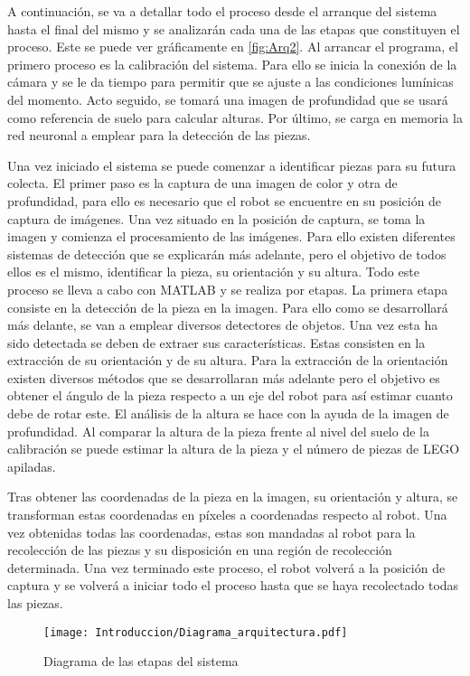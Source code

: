 A continuación, se va a detallar todo el proceso desde el arranque del sistema hasta el final del mismo y se analizarán cada una de las etapas que constituyen el proceso. Este se puede ver gráficamente en \autoref{fig:Arq2}. Al arrancar el programa, el primero proceso es la calibración del sistema. Para ello se inicia la conexión de la cámara y se le da tiempo para permitir que se ajuste a las condiciones lumínicas del momento. Acto seguido, se tomará una imagen de profundidad que se usará como referencia de suelo para calcular alturas. Por último, se carga en memoria la red neuronal a emplear para la detección de las piezas.

Una vez iniciado el sistema se puede comenzar a identificar piezas para su futura colecta. El primer paso es la captura de una imagen de color y otra de profundidad, para ello es necesario que el robot se encuentre en su posición de captura de imágenes. Una vez situado en la posición de captura, se toma la imagen y comienza el procesamiento de las imágenes. Para ello existen diferentes sistemas de detección que se explicarán más adelante, pero el objetivo de todos ellos es el mismo, identificar la pieza, su orientación y su altura. Todo este proceso se lleva a cabo con MATLAB y se realiza por etapas. La primera etapa consiste en la detección de la pieza en la imagen. Para ello como se desarrollará más delante, se van a emplear diversos detectores de objetos. Una vez esta ha sido detectada se deben de extraer sus características. Estas consisten en la extracción de su orientación y de su altura. Para la extracción de la orientación existen diversos métodos que se desarrollaran más adelante pero el objetivo es obtener el ángulo de la pieza respecto a un eje del robot para así estimar cuanto debe de rotar este. El análisis de la altura se hace con la ayuda de la imagen de profundidad. Al comparar la altura de la pieza frente al nivel del suelo de la calibración se puede estimar la altura de la pieza y el número de piezas de LEGO apiladas.

Tras obtener las coordenadas de la pieza en la imagen, su orientación y altura, se transforman estas coordenadas en píxeles a coordenadas respecto al robot. Una vez obtenidas todas las coordenadas, estas son mandadas al robot para la recolección de las piezas y su disposición en una región de recolección determinada. Una vez terminado este proceso, el robot volverá a la posición de captura y se volverá a iniciar todo el proceso hasta que se haya recolectado todas las piezas.

	\begin{figure}[ht]
		\centering
		\texttt{[image: Introduccion/Diagrama\_arquitectura.pdf]}
		\caption{Diagrama de las etapas del sistema}
		\label{fig:Arq2}
		\vspace{-5pt}
	\end{figure}

